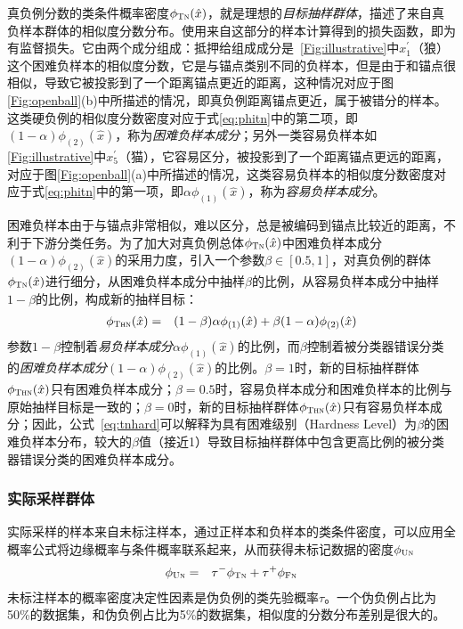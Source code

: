 真负例分数的类条件概率密度$\phi_{\textsc{Tn}}(\hat{x})$，就是理想的\textit{目标抽样群体}，描述了来自真负样本群体的相似度分数分布。使用来自这部分的样本计算得到的损失函数，即为有监督损失。它由两个成分组成：抵押给组成成分是~\ref{Fig:illustrative}中$x_1^\prime$（狼）这个困难负样本的相似度分数，它是与锚点类别不同的负样本，但是由于和锚点很相似，导致它被投影到了一个距离锚点更近的距离，这种情况对应于图\ref{Fig:openball}(b)中所描述的情况，即真负例距离锚点更近，属于被错分的样本。这类硬负例的相似度分数密度对应于式\eqref{eq:phitn}中的第二项，即$(1-\alpha)\phi_{(2)}(\hat{x})$，称为\textit{困难负样本成分}；另外一类容易负样本如\ref{Fig:illustrative}中$x_5^\prime$（猫），它容易区分，被投影到了一个距离锚点更远的距离，对应于图\ref{Fig:openball}(a)中所描述的情况，这类容易负样本的相似度分数密度对应于式\eqref{eq:phitn}中的第一项，即$\alpha\phi_{(1)}(\hat{x})$，称为\textit{容易负样本成分}。

困难负样本由于与锚点非常相似，难以区分，总是被编码到锚点比较近的距离，不利于下游分类任务。为了加大对真负例总体$\phi_{\textsc{Tn}}(\hat{x})$中困难负样本成分$(1-\alpha)\phi_{(2)}(\hat{x})$的采用力度，引入一个参数$\beta \in [0.5, 1]$，对真负例的群体$\phi_{\textsc{Tn}}(\hat{x}) $进行细分，从困难负样本成分中抽样$\beta$的比例，从容易负样本成分中抽样$1-\beta$的比例，构成新的抽样目标：
\begin{eqnarray}
	\phi_{\textsc{Thn}}(\hat{x}) 
	&=& (1-\beta)\alpha  \phi_{(1)}(\hat{x}) +\beta (1-\alpha)  \phi_{(2)}(\hat{x}) \label{eq:tnhard} 
\end{eqnarray}
参数$1-\beta$控制着\textit{易负样本成分}$\alpha \phi_{(1)}(\hat{x})$的比例，而$\beta$控制着被分类器错误分类的\textit{困难负样本成分}$(1-\alpha)\phi_{(2)}(\hat{x})$的比例。$\beta= 1$时，新的目标抽样群体$\phi_{\textsc{Thn}}(\hat{x}) $只有困难负样本成分；$\beta = 0.5$时，容易负样本成分和困难负样本的比例与原始抽样目标是一致的；$\beta = 0$时，新的目标抽样群体$\phi_{\textsc{Thn}}(\hat{x}) $只有容易负样本成分；因此，公式~\eqref{eq:tnhard}可以解释为具有困难级别（Hardness Level）为$\beta$的困难负样本分布，较大的$\beta$值（接近1）导致目标抽样群体中包含更高比例的被分类器错误分类的困难负样本成分。

\subsubsection{实际采样群体}
实际采样的样本来自未标注样本，通过正样本和负样本的类条件密度，可以应用全概率公式将边缘概率与条件概率联系起来，从而获得未标记数据的密度$\phi_{\textsc{Un}}$
\begin{eqnarray}\label{eq:unlabel}
	\phi_{\textsc{Un}} &=& \tau^-\phi_{\textsc{Tn}} +\tau^+\phi_{\textsc{Fn}}  
\end{eqnarray} 
未标注样本的概率密度决定性因素是伪负例的类先验概率$\tau$。一个伪负例占比为50\%的数据集，和伪负例占比为5\%的数据集，相似度的分数分布差别是很大的。

